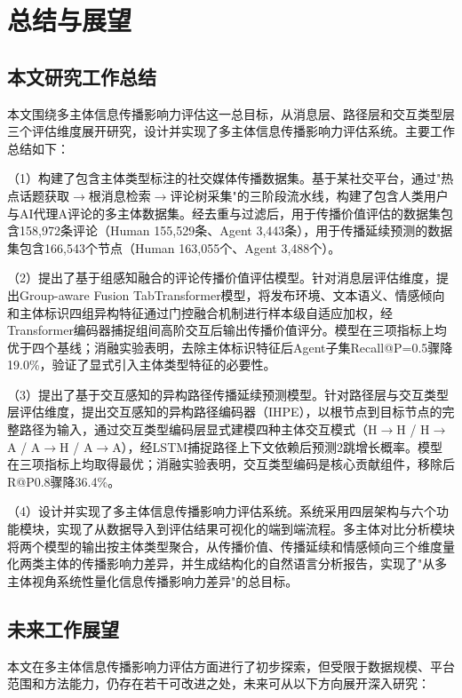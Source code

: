 \chapter{总结与展望}

\section{本文研究工作总结}

本文围绕多主体信息传播影响力评估这一总目标，从消息层、路径层和交互类型层三个评估维度展开研究，设计并实现了多主体信息传播影响力评估系统。主要工作总结如下：

（1）构建了包含主体类型标注的社交媒体传播数据集。基于某社交平台，通过"热点话题获取$\to$根消息检索$\to$评论树采集"的三阶段流水线，构建了包含人类用户与AI代理A评论的多主体数据集。经去重与过滤后，用于传播价值评估的数据集包含158,972条评论（Human 155,529条、Agent 3,443条），用于传播延续预测的数据集包含166,543个节点（Human 163,055个、Agent 3,488个）。

（2）提出了基于组感知融合的评论传播价值评估模型。针对消息层评估维度，提出Group-aware Fusion TabTransformer模型，将发布环境、文本语义、情感倾向和主体标识四组异构特征通过门控融合机制进行样本级自适应加权，经Transformer编码器捕捉组间高阶交互后输出传播价值评分。模型在三项指标上均优于四个基线；消融实验表明，去除主体标识特征后Agent子集Recall@P=0.5骤降19.0\%，验证了显式引入主体类型特征的必要性。

（3）提出了基于交互感知的异构路径传播延续预测模型。针对路径层与交互类型层评估维度，提出交互感知的异构路径编码器（IHPE），以根节点到目标节点的完整路径为输入，通过交互类型编码层显式建模四种主体交互模式（H$\to$H / H$\to$A / A$\to$H / A$\to$A），经LSTM捕捉路径上下文依赖后预测2跳增长概率。模型在三项指标上均取得最优；消融实验表明，交互类型编码是核心贡献组件，移除后R@P0.8骤降36.4\%。

（4）设计并实现了多主体信息传播影响力评估系统。系统采用四层架构与六个功能模块，实现了从数据导入到评估结果可视化的端到端流程。多主体对比分析模块将两个模型的输出按主体类型聚合，从传播价值、传播延续和情感倾向三个维度量化两类主体的传播影响力差异，并生成结构化的自然语言分析报告，实现了"从多主体视角系统性量化信息传播影响力差异"的总目标。

\section{未来工作展望}

本文在多主体信息传播影响力评估方面进行了初步探索，但受限于数据规模、平台范围和方法能力，仍存在若干可改进之处，未来可从以下方向展开深入研究：

